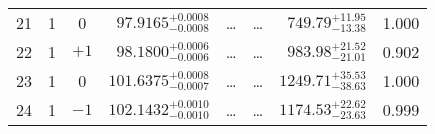 \begin{table*}[!]
\begin{tabular}{llcrrlrc}
21 & 1 & 0 & $     97.9165_{-      0.0008}^{+      0.0008}$ & \multicolumn{1}{c}{\dots} & \multicolumn{1}{c}{\dots} & $      749.79_{-       13.38}^{+       11.95}$ & 1.000\\[1pt]
22 & 1 & $+1$ & $     98.1800_{-      0.0006}^{+      0.0006}$ & \multicolumn{1}{c}{\dots} & \multicolumn{1}{c}{\dots} & $      983.98_{-       21.01}^{+       21.52}$ & 0.902\\[1pt]
23 & 1 & 0 & $    101.6375_{-      0.0007}^{+      0.0008}$ & \multicolumn{1}{c}{\dots} & \multicolumn{1}{c}{\dots} & $     1249.71_{-       38.63}^{+       35.53}$ & 1.000\\[1pt]
24 & 1 & $-1$ & $    102.1432_{-      0.0010}^{+      0.0010}$ & \multicolumn{1}{c}{\dots} & \multicolumn{1}{c}{\dots} & $     1174.53_{-       23.63}^{+       22.62}$ & 0.999\\[1pt]


\end{tabular}
\end{table*}
